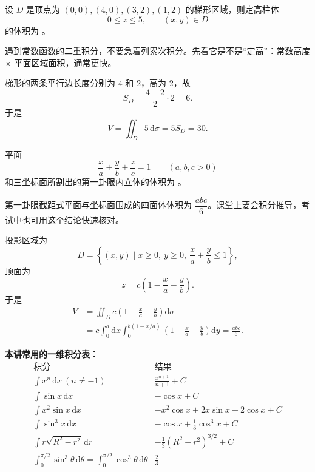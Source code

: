 \documentclass[answer,fontset=fandol]{THUExam}
\begin{document}
\begin{problem}
设 $D$ 是顶点为 $(0,0),(4,0),(3,2),(1,2)$ 的梯形区域，则定高柱体
\[
0\leqslant z\leqslant 5,\qquad (x,y)\in D
\]
的体积为 。
\end{problem}
\begin{note}
遇到常数函数的二重积分，不要急着列累次积分。先看它是不是``定高''：常数高度 $\times$ 平面区域面积，通常更快。
\end{note}
\begin{solution}
梯形的两条平行边长度分别为 $4$ 和 $2$，高为 $2$，故
\[
S_D=\frac{4+2}{2}\cdot2=6.
\]
于是
\[
V=\iint_D5\,\mathrm{d}\sigma=5S_D=\boxed{30}.
\]
\end{solution}
\bigskip

\begin{problem}
平面
\[
\frac{x}{a}+\frac{y}{b}+\frac{z}{c}=1\qquad(a,b,c>0)
\]
和三坐标面所割出的第一卦限内立体的体积为 。
\end{problem}
\begin{note}
第一卦限截距式平面与坐标面围成的四面体体积为 $\dfrac{abc}{6}$。课堂上要会积分推导，考试中也可用这个结论快速核对。
\end{note}
\begin{solution}
投影区域为
\[
D=\left\{(x,y)\mid x\geqslant0,\ y\geqslant0,\ \frac{x}{a}+\frac{y}{b}\leqslant1\right\},
\]
顶面为
\[
z=c\left(1-\frac{x}{a}-\frac{y}{b}\right).
\]
于是
\begin{align*}
V
&=\iint_D c\left(1-\frac{x}{a}-\frac{y}{b}\right)\mathrm{d}\sigma\\
&=c\int_0^a\mathrm{d}x\int_0^{b(1-x/a)}
\left(1-\frac{x}{a}-\frac{y}{b}\right)\mathrm{d}y
=\boxed{\frac{abc}{6}}.
\end{align*}
\end{solution}
\bigskip

\begin{note}
\textbf{本讲常用的一维积分表：}
\[
\begin{array}{c|c}
\text{积分} & \text{结果} \\ \hline
\displaystyle\int x^n\,\mathrm{d}x\ (n\neq-1) & \displaystyle\frac{x^{n+1}}{n+1}+C\\[6pt]
\displaystyle\int \sin x\,\mathrm{d}x & -\cos x+C\\[4pt]
\displaystyle\int x^2\sin x\,\mathrm{d}x & -x^2\cos x+2x\sin x+2\cos x+C\\[4pt]
\displaystyle\int\sin^3x\,\mathrm{d}x & -\cos x+\frac{1}{3}\cos^3x+C\\[4pt]
\displaystyle\int r\sqrt{R^2-r^2}\,\mathrm{d}r & -\frac{1}{3}(R^2-r^2)^{3/2}+C\\[6pt]
\displaystyle\int_0^{\pi/2}\sin^3\theta\,\mathrm{d}\theta
=\int_0^{\pi/2}\cos^3\theta\,\mathrm{d}\theta & \displaystyle\frac{2}{3}
\end{array}
\]
\end{note}
\bigskip
\end{document}
